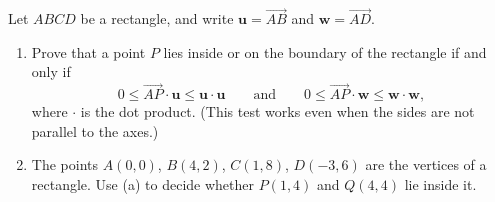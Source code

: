 Let $ABCD$ be a rectangle, and write $\mathbf u=\overrightarrow{AB}$ and $\mathbf w=\overrightarrow{AD}$.
\begin{enumerate}
\item[(a)] Prove that a point $P$ lies inside or on the boundary of the rectangle if and only if
\[0\le\overrightarrow{AP}\cdot\mathbf u\le\mathbf u\cdot\mathbf u\qquad\text{and}\qquad0\le\overrightarrow{AP}\cdot\mathbf w\le\mathbf w\cdot\mathbf w,\]
where $\cdot$ is the dot product. (This test works even when the sides are not parallel to the axes.)
\item[(b)] The points $A(0,0)$, $B(4,2)$, $C(1,8)$, $D(-3,6)$ are the vertices of a rectangle. Use (a) to decide whether $P(1,4)$ and $Q(4,4)$ lie inside it.
\end{enumerate}
